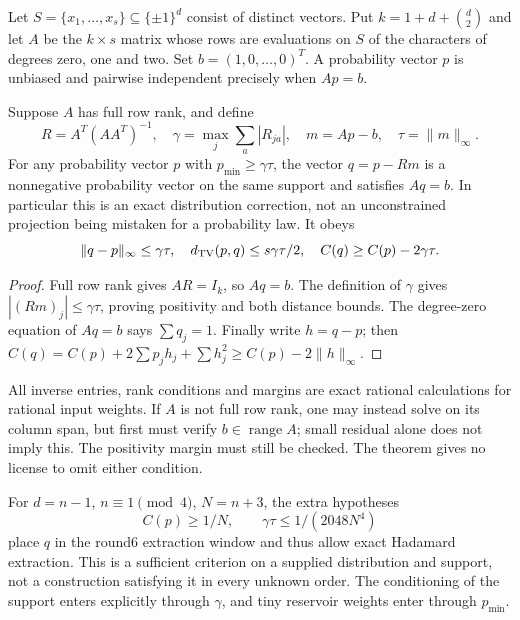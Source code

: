
Let $S=\{x_1,\ldots,x_s\}\subseteq\{\pm1\}^d$ consist of distinct
vectors. Put $k=1+d+\binom d2$ and let $A$ be the $k\times s$ matrix
whose rows are evaluations on $S$ of the characters of degrees zero,
one and two. Set $b=(1,0,\ldots,0)^T$. A probability vector $p$ is
unbiased and pairwise independent precisely when $Ap=b$.

\begin{theorem}
Suppose $A$ has full row rank, and define
\[
 R=A^T(AA^T)^{-1},\quad
 \gamma=\max_j\sum_a|R_{ja}|,\quad
 m=Ap-b,\quad \tau=\|m\|_\infty.
\]
For any probability vector $p$ with $p_{\min}\ge\gamma\tau$, the
vector $q=p-Rm$ is a nonnegative probability vector on the same
support and satisfies $Aq=b$. In particular this is an exact
distribution correction, not an unconstrained projection being
mistaken for a probability law. It obeys
\[
 \|q-p\|_\infty\le\gamma\tau,\quad
 d_{\rm TV}(p,q)\le s\gamma\tau/2,\quad
 C(q)\ge C(p)-2\gamma\tau.
\]
\end{theorem}
\begin{proof}
Full row rank gives $AR=I_k$, so $Aq=b$. The definition of $\gamma$
gives $|(Rm)_j|\le\gamma\tau$, proving positivity and both distance
bounds. The degree-zero equation of $Aq=b$ says $\sum q_j=1$.
Finally write $h=q-p$; then
$C(q)=C(p)+2\sum p_jh_j+\sum h_j^2\ge C(p)-2\|h\|_\infty$.
\end{proof}
All inverse entries, rank conditions and margins are exact rational
calculations for rational input weights. If $A$ is not full row rank,
one may instead solve on its column span, but first must verify
$b\in\operatorname{range}A$; small residual alone does not imply this.
The positivity margin must still be checked. The theorem gives no
license to omit either condition.

For $d=n-1$, $n\equiv1\pmod4$, $N=n+3$, the extra hypotheses
\[
 C(p)\ge1/N,\qquad \gamma\tau\le1/(2048N^4)
\]
place $q$ in the round6 extraction window and thus allow exact
Hadamard extraction. This is a sufficient criterion on a supplied
distribution and support, not a construction satisfying it in every
unknown order. The conditioning of the support enters explicitly
through $\gamma$, and tiny reservoir weights enter through $p_{\min}$.

